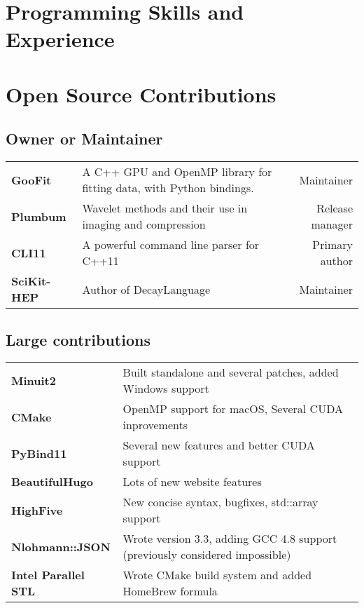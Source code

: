 \documentclass[10pt,letterpaper,english]{moderncv}
\begin{document}
\section{Programming Skills and Experience}


\section{Open Source Contributions}

\subsection{Owner or Maintainer}

\begin{tabularx}{\textwidth}{>{\bfseries}p{1.1in}Xr}
	GooFit & A C++ GPU and OpenMP library for fitting data, with Python bindings. & Maintainer \\
	Plumbum & Wavelet methods and their use in imaging and compression &  Release manager \\
	CLI11 & A powerful command line parser for C++11 & Primary author \\
	SciKit-HEP & Author of DecayLanguage & Maintainer \\
\end{tabularx}

\subsection{Large contributions}
\begin{tabularx}{\textwidth}{>{\bfseries}p{1.1in}X}
	Minuit2        & Built standalone and several patches, added Windows support \\
	CMake          &  OpenMP support for macOS, Several CUDA inprovements  \\
	PyBind11       &  Several new features and better CUDA support      \\
	BeautifulHugo  &   Lots of new website features    \\
	HighFive       &    New concise syntax, bugfixes, std::array support  \\
	Nlohmann::JSON & Wrote version 3.3, adding GCC 4.8 support (previously considered impossible) \\
	Intel Parallel STL & Wrote CMake build system and added HomeBrew formula \\
\end{tabularx}
\end{document}
